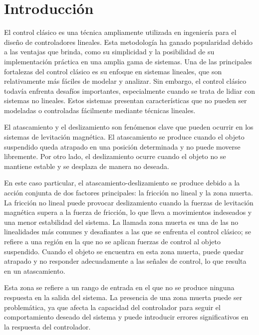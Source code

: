 \chapter{Introducción}
El control clásico es una técnica ampliamente utilizada en ingeniería para el diseño de controladores lineales. Esta metodología ha ganado popularidad debido a las ventajas que brinda, como su simplicidad y la posibilidad de su implementación práctica en una amplia gama de sistemas. Una de las principales fortalezas del control clásico es su enfoque en sistemas lineales, que son relativamente más fáciles de modelar y analizar. Sin embargo, el control clásico todavía enfrenta desafíos importantes, especialmente cuando se trata de lidiar con sistemas no lineales. Estos sistemas presentan características que no pueden ser modeladas o controladas fácilmente mediante técnicas lineales.

El atascamiento y el deslizamiento son fenómenos clave que pueden ocurrir en los sistemas de levitación magnética. El atascamiento se produce cuando el objeto suspendido queda atrapado en una posición determinada y no puede moverse libremente. Por otro lado, el deslizamiento ocurre cuando el objeto no se mantiene estable y se desplaza de manera no deseada.

En este caso particular, el atascamiento-deslizamiento se produce debido a la acción conjunta de dos factores principales: la fricción no lineal y la zona muerta. La fricción no lineal puede provocar deslizamiento cuando la fuerzas de levitación magnética supera a la fuerza de fricción, lo que lleva a movimientos indeseados y una menor estabilidad del sistema. La llamada zona muerta es una de las no linealidades más comunes y desafiantes a las que se enfrenta el control clásico; se refiere a una región en la que no se aplican fuerzas de control al objeto suspendido. Cuando el objeto se encuentra en esta zona muerta, puede quedar atrapado y no responder adecuadamente a las señales de control, lo que resulta en un atascamiento.

Esta zona se refiere a un rango de entrada en el que no se produce ninguna respuesta en la salida del sistema. La presencia de una zona muerta puede ser problemática, ya que afecta la capacidad del controlador para seguir el comportamiento deseado del sistema y puede introducir errores significativos en la respuesta del controlador.

